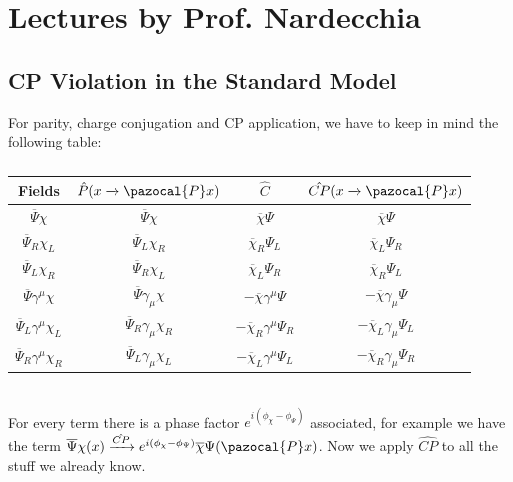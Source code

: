 \documentclass[../main.tex]{subfiles}
\begin{document}
\setchapterpreamble[u]{\margintoc}
\chapter[Lectures by Prof. Nardecchia]{Lectures by Prof. Nardecchia\footnotemark[0]}
\section{CP Violation in the Standard Model}
For parity, charge conjugation and CP application, we have to keep in mind the following table:
\begin{table}[h]
    \centering
    {\renewcommand{\arraystretch}{1}
    \begin{tabular}{c|c|c|c}
    \hline
    \rowcolor{gray!45}Fields & $\hat{P}(x\xrightarrow[]{}\pazocal{P}x)$ & $\hat{C}$ & $\hat{CP}(x\xrightarrow[]{}\pazocal{P}x)$\\
    \hline
    $\overline{\Psi}\chi$ & $\overline{\Psi}\chi$ & $\overline{\chi}\Psi$ & $\overline{\chi}\Psi$\\
    $\overline{\Psi}_R\chi_L$ & $\overline{\Psi}_L\chi_R$ & $\overline{\chi}_R\Psi_L$ & $\overline{\chi}_L\Psi_R$\\
    $\overline{\Psi}_L\chi_R$ & $\overline{\Psi}_R\chi_L$ & $\overline{\chi}_L\Psi_R$ & $\overline{\chi}_R\Psi_L$\\
    $\overline{\Psi}\gamma^\mu\chi$ & $\overline{\Psi}\gamma_\mu\chi$ & $-\overline{\chi}\gamma^\mu\Psi$ & $-\overline{\chi}\gamma_\mu\Psi$ \\
    $\overline{\Psi}_L\gamma^\mu\chi_L$ & $\overline{\Psi}_R\gamma_\mu\chi_R$ & $-\overline{\chi}_R\gamma^\mu\Psi_R$ & $-\overline{\chi}_L\gamma_\mu\Psi_L$\\
    $\overline{\Psi}_R\gamma^\mu\chi_R$ & $\overline{\Psi}_L\gamma_\mu\chi_L$ & $-\overline{\chi}_L\gamma^\mu\Psi_L$ & $-\overline{\chi}_R\gamma_\mu\Psi_R$\\
    \hline
    \end{tabular}
    }
    \caption*{}
\end{table}\\
For every term there is a phase factor $e^{i(\phi_\chi-\phi_\Psi)}$ associated, for example we have the term $\overline{\Psi}\chi(x)\xrightarrow[]{\hat{CP}}e^{i(\phi_\chi-\phi_\Psi)}\overline{\chi}\Psi(\pazocal{P}x)$. Now we apply $\hat{CP}$ to all the stuff we already know.
\end{document}
